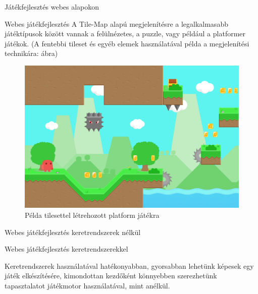 \begin{MyChapter}{Játékfejlesztés webes alapokon}
\begin{MySection}{Webes játékfejlesztés}
		A Tile-Map alapú megjelenítésre a legalkalmasabb játéktípusok között vannak a felülnézetes, a puzzle, vagy például a platformer játékok. (A fentebbi tileset és egyéb elemek használatával példa a megjelenítési technikára:  ábra)
		\begin{figure}[h!]
			\centering
			\includegraphics[scale=0.35]{kepek/tileMap/TileMapPreview.png}
			\caption{Példa tilesettel létrehozott platform játékra}
			\label{fig:tileMap:tileMapPreview}
		\end{figure}
	\end{MySection}

	\begin{MySection}{Webes játékfejlesztés keretrendszerek nélkül}
	\end{MySection}

	\begin{MySection}{Webes játékfejlesztés keretrendszerekkel}
		
		Keretrendszerek használatával hatékonyabban, gyorsabban lehetünk képesek egy játék elkészítésére, kimondottan kezdőként könnyebben szerezhetünk tapasztalatot játékmotor használatával, mint anélkül.
		

\end{MySection}
\end{MyChapter}
